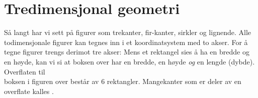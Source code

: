\newpage
{}

\section{Tredimensjonal geometri}
Så langt har vi sett på  figurer som trekanter, fir-kanter, sirkler og lignende. Alle todimensjonale figurer kan tegnes inn i et koordinatsystem med to akser.
For å tegne  figurer trengs derimot tre akser:
Mens et rektangel sies å ha en bredde og en høyde, kan vi si at boksen over har en bredde, en høyde \textsl{og} en lengde (dybde). Overflaten til \\boksen i figuren over består av 6 rektangler. Mangekanter som er deler av en overflate kalles .

